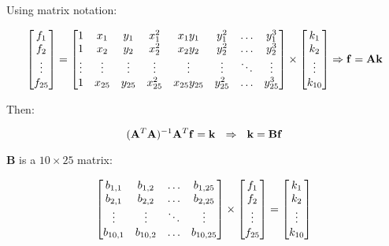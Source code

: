 \documentclass{ipol}
\numberwithin{equation}{section}
\numberwithin{table}{section}
\begin{document}
Using matrix notation:

\begin{equation*}
	\begin{bmatrix} 
		f_1		\\ 
		f_2		\\ 
		\vdots	\\
		f_{25}
	\end{bmatrix} 
	= 
	\begin{bmatrix} 
		1 		& x_1 		& y_1 		& x_1^2 	& x_1y_1 		& y_1^2 	& \hdots 	& y_1^3 	\\
		1 		& x_2 		& y_2 		& x_2^2 	& x_2y_2 		& y_2^2 	& \hdots 	& y_2^3 	\\
		\vdots	& \vdots	& \vdots	& \vdots	& \vdots		& \vdots	& \ddots	& \vdots	\\
		1 		& x_{25}	& y_{25}	& x_{25}^2 	& x_{25}y_{25} 	& y_{25}^2 	& \hdots 	& y_{25}^3
	\end{bmatrix}
	\times
	\begin{bmatrix}
		k_1		\\
		k_2		\\
		\vdots	\\
		k_{10}
	\end{bmatrix}
	\Rightarrow \mathbf{f} = \mathbf{A}\mathbf{k}\\
\end{equation*}

Then:

\begin{equation*}
	(\mathbf{A}^T\mathbf{A})^{-1}\mathbf{A}^T\mathbf{f} = \mathbf{k} \ \ \Rightarrow \ \ \mathbf{k} = \mathbf{B}\mathbf{f}\\
\end{equation*}

$\mathbf{B}$ is a $10\times25$ matrix: 

\begin{equation*}
	\begin{bmatrix}
		b_{1,1}		& b_{1,2}	& \hdots	& b_{1,25}	\\
		b_{2,1}		& b_{2,2}	& \hdots	& b_{2,25}	\\
		\vdots		& \vdots	& \ddots	& \vdots	\\
		b_{10,1}	& b_{10,2}	& \hdots	& b_{10,25}
	\end{bmatrix}
	\times
	\begin{bmatrix}
		f_1		\\
		f_2		\\
		\vdots	\\
		f_{25}
	\end{bmatrix}
	=
	\begin{bmatrix}
		k_1		\\
		k_2		\\
		\vdots	\\
		k_{10}
	\end{bmatrix}\\
\end{equation*}
\end{document}
